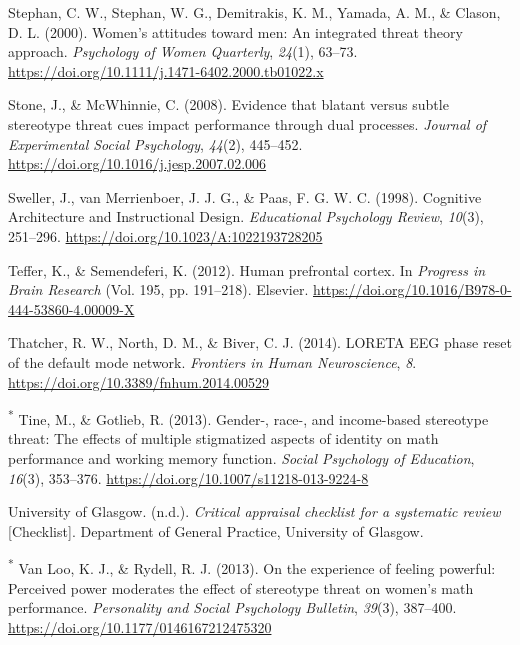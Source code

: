 \documentclass[
  stu, a4paper,floatsintext]{apa7}
\newlength{\cslhangindent}
\newenvironment{CSLReferences}[2] %
 {\begin{list}{}{%
  \setlength{\itemindent}{0pt}
  \setlength{\leftmargin}{0pt}
  \setlength{\parsep}{0pt}
  \ifodd #1
   \setlength{\leftmargin}{\cslhangindent}
   \setlength{\itemindent}{-1\cslhangindent}
  \fi
  \setlength{\itemsep}{#2\baselineskip}}}
 {\end{list}}
\begin{document}
\begin{CSLReferences}{1}{0}
Stephan, C. W., Stephan, W. G., Demitrakis, K. M., Yamada, A. M., \& Clason, D. L. (2000). Women's attitudes toward men: An integrated threat theory approach. \emph{Psychology of Women Quarterly}, \emph{24}(1), 63--73. \url{https://doi.org/10.1111/j.1471-6402.2000.tb01022.x}

Stone, J., \& McWhinnie, C. (2008). Evidence that blatant versus subtle stereotype threat cues impact performance through dual processes. \emph{Journal of Experimental Social Psychology}, \emph{44}(2), 445--452. \url{https://doi.org/10.1016/j.jesp.2007.02.006}

Sweller, J., van Merrienboer, J. J. G., \& Paas, F. G. W. C. (1998). Cognitive {Architecture} and {Instructional Design}. \emph{Educational Psychology Review}, \emph{10}(3), 251--296. \url{https://doi.org/10.1023/A:1022193728205}

Teffer, K., \& Semendeferi, K. (2012). Human prefrontal cortex. In \emph{Progress in {Brain Research}} (Vol. 195, pp. 191--218). Elsevier. \url{https://doi.org/10.1016/B978-0-444-53860-4.00009-X}

Thatcher, R. W., North, D. M., \& Biver, C. J. (2014). {LORETA EEG} phase reset of the default mode network. \emph{Frontiers in Human Neuroscience}, \emph{8}. \url{https://doi.org/10.3389/fnhum.2014.00529}

\textsuperscript{*} Tine, M., \& Gotlieb, R. (2013). Gender-, race-, and income-based stereotype threat: The effects of multiple stigmatized aspects of identity on math performance and working memory function. \emph{Social Psychology of Education}, \emph{16}(3), 353--376. \url{https://doi.org/10.1007/s11218-013-9224-8}

University of Glasgow. (n.d.). \emph{Critical appraisal checklist for a systematic review} {[}Checklist{]}. Department of General Practice, University of Glasgow.

\textsuperscript{*} Van Loo, K. J., \& Rydell, R. J. (2013). On the experience of feeling powerful: {Perceived} power moderates the effect of stereotype threat on women's math performance. \emph{Personality and Social Psychology Bulletin}, \emph{39}(3), 387--400. \url{https://doi.org/10.1177/0146167212475320}


\end{CSLReferences}
\end{document}
